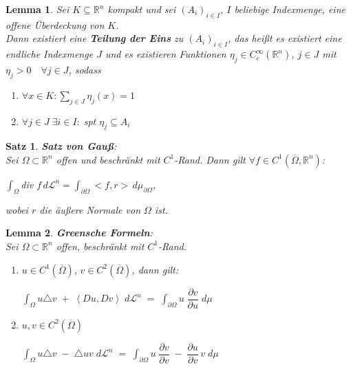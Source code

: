 \documentclass[11pt]{memoir}
\theoremstyle{changebreak}
\newtheorem{Lemma}{Lemma}[chapter]
\newtheorem{Satz}{Satz}[chapter]
\newcommand{\dom}{\partial\Omega}
\newcommand{\oo}{\overline{\Omega}}
\begin{document}
\begin{Lemma}
Sei $K \subseteq \mathbb R^n$ kompakt und sei $(A_i)_{i \in I}$, $I$ beliebige Indexmenge, eine offene Überdeckung von $K$. \\
Dann existiert eine \textbf{Teilung der Eins} zu $(A_i)_{i \in I}$, das heißt es existiert eine endliche Indexmenge $J$ und es existieren Funktionen $\eta_j \in C_c^\infty(\mathbb R^n)$, $j \in J$ mit $\eta_j > 0 \quad \forall j \in J$, sodass
\begin{enumerate}
	\item $\forall x \in K: \sum\limits_{j \in J} \eta_j(x) =1$
	\item $\forall j \in J \; \exists i \in I: \; $spt $ \eta_j \subseteq A_i$
\end{enumerate}
\end{Lemma}


\begin{Satz}
\emph{\textbf{Satz von Gauß}}: \\
Sei $\Omega \subset \mathbb R^n$ offen und beschränkt mit $C^1$-Rand. Dann gilt $\forall f \in C^1(\overline \Omega, \mathbb R^n)$:
\begin{center}
	$\int_\Omega $div $f\, d\mathscr L^n = \int_{\dom} <f, r> \, d\mu_{\dom}$,
\end{center}
wobei $r$ die äußere Normale von $\Omega$ ist.
\end{Satz}



\begin{Lemma}
\emph{\textbf{Greensche Formeln}}: \\
Sei $\Omega \subset \mathbb R^n$ offen, beschränkt mit $C^1$-Rand.
\begin{enumerate}
	\item $u \in C^1(\overline{\Omega}), \, v \in C^2(\oo)$, dann gilt:
	\begin{center}
		$\int_\Omega u \triangle v \; + \; \left\langle Du, Dv \right\rangle \; d\mathscr L^n \; = \; \int_{\dom} u \;\dfrac{\partial v}{\partial u}\; d\mu$
	\end{center}
	\item $u, v \in C^2(\oo)$
	\begin{center}
		$\int_\Omega u \triangle v \; - \; \triangle u v \; d\mathscr L^n \; = \; \int_{\dom} u \; \dfrac{\partial v}{\partial v} \; - \; \dfrac{\partial u}{\partial v} \, v \; d\mu$
	\end{center}
\end{enumerate}
\end{Lemma}
\end{document}
